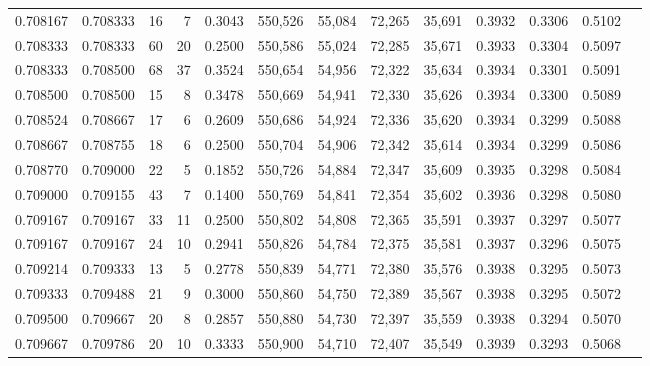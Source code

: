 \begin{tabular}{rrrrrrrrrrrrr}
0.708167 & 0.708333 &    16 &   7 &                                     0.3043 & 550,526 &  55,084 &  72,265 &  35,691 & 0.3932 & 0.3306 & 0.5102 \\
0.708333 & 0.708333 &    60 &  20 &                                     0.2500 & 550,586 &  55,024 &  72,285 &  35,671 & 0.3933 & 0.3304 & 0.5097 \\
0.708333 & 0.708500 &    68 &  37 &                                     0.3524 & 550,654 &  54,956 &  72,322 &  35,634 & 0.3934 & 0.3301 & 0.5091 \\
0.708500 & 0.708500 &    15 &   8 &                                     0.3478 & 550,669 &  54,941 &  72,330 &  35,626 & 0.3934 & 0.3300 & 0.5089 \\
0.708524 & 0.708667 &    17 &   6 &                                     0.2609 & 550,686 &  54,924 &  72,336 &  35,620 & 0.3934 & 0.3299 & 0.5088 \\
0.708667 & 0.708755 &    18 &   6 &                                     0.2500 & 550,704 &  54,906 &  72,342 &  35,614 & 0.3934 & 0.3299 & 0.5086 \\
0.708770 & 0.709000 &    22 &   5 &                                     0.1852 & 550,726 &  54,884 &  72,347 &  35,609 & 0.3935 & 0.3298 & 0.5084 \\
0.709000 & 0.709155 &    43 &   7 &                                     0.1400 & 550,769 &  54,841 &  72,354 &  35,602 & 0.3936 & 0.3298 & 0.5080 \\
0.709167 & 0.709167 &    33 &  11 &                                     0.2500 & 550,802 &  54,808 &  72,365 &  35,591 & 0.3937 & 0.3297 & 0.5077 \\
0.709167 & 0.709167 &    24 &  10 &                                     0.2941 & 550,826 &  54,784 &  72,375 &  35,581 & 0.3937 & 0.3296 & 0.5075 \\
0.709214 & 0.709333 &    13 &   5 &                                     0.2778 & 550,839 &  54,771 &  72,380 &  35,576 & 0.3938 & 0.3295 & 0.5073 \\
0.709333 & 0.709488 &    21 &   9 &                                     0.3000 & 550,860 &  54,750 &  72,389 &  35,567 & 0.3938 & 0.3295 & 0.5072 \\
0.709500 & 0.709667 &    20 &   8 &                                     0.2857 & 550,880 &  54,730 &  72,397 &  35,559 & 0.3938 & 0.3294 & 0.5070 \\
0.709667 & 0.709786 &    20 &  10 &                                     0.3333 & 550,900 &  54,710 &  72,407 &  35,549 & 0.3939 & 0.3293 & 0.5068 \\

\end{tabular}

